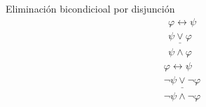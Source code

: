 \begin{ruleinf} \label{relinf_equivlor} Eliminación bicondicioal por disjunción
	\begin{equation}
	\begin{gathered}
		\varphi \leftrightarrow \psi \\
		\underline {\psi \lor \varphi } \\
		\psi \land \varphi 
	\end{gathered}
	\end{equation}
	\begin{equation}
	\begin{gathered}
		\varphi \leftrightarrow \psi \\
		\underline {\neg\psi \lor \neg\varphi } \\
		\neg\psi \land \neg\varphi 
	\end{gathered}
\end{equation}
\end{ruleinf}
